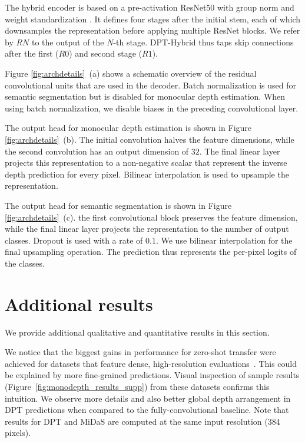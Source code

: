 \documentclass[10pt,twocolumn,letterpaper]{article}
\begin{document}
 The hybrid encoder is based on a pre-activation
ResNet50 with group norm and weight standardization . It
defines four stages after the initial stem, each of which downsamples the
representation before applying multiple ResNet blocks. We refer by $RN$ to the
output of the $N$-th stage. DPT-Hybrid thus taps skip connections after the
first ($R0$) and second stage ($R1$).

Figure \ref{fig:archdetails}~(a) shows a schematic overview of the residual convolutional
units  that are used in the decoder. Batch normalization is used for
semantic segmentation but is disabled for monocular depth estimation. When using batch
normalization, we disable biases in the preceding convolutional layer.

 The output head for monocular depth
estimation is shown in Figure \ref{fig:archdetails}~(b). The initial convolution
halves the feature dimensions, while the second convolution has an output
dimension of $32$. The final linear layer projects this representation to a
non-negative scalar that represent the inverse depth prediction for every pixel.
Bilinear interpolation is used to upsample the representation.


 The output head for semantic segmentation is
shown in Figure \ref{fig:archdetails}~(c). the first convolutional block
preserves the feature dimension, while the final linear layer projects the
representation to the number of output classes. Dropout is used with a rate of
$0.1$. We use bilinear interpolation for the final upsampling operation. The
prediction thus represents the per-pixel logits of the classes.


\section{Additional results}
We provide additional qualitative and quantitative results in this section.

 We notice that the biggest gains in
performance for zero-shot transfer were achieved for datasets that feature
dense, high-resolution evaluations~.
This could be explained by more fine-grained predictions. Visual inspection of
sample results (\cf Figure~\ref{fig:monodepth_results_supp}) from these datasets
confirms this intuition. We observe more details and also better global depth arrangement
in DPT predictions when compared to the fully-convolutional baseline.  Note that
results for DPT and MiDaS are computed at the same input resolution (384 pixels).
\end{document}
